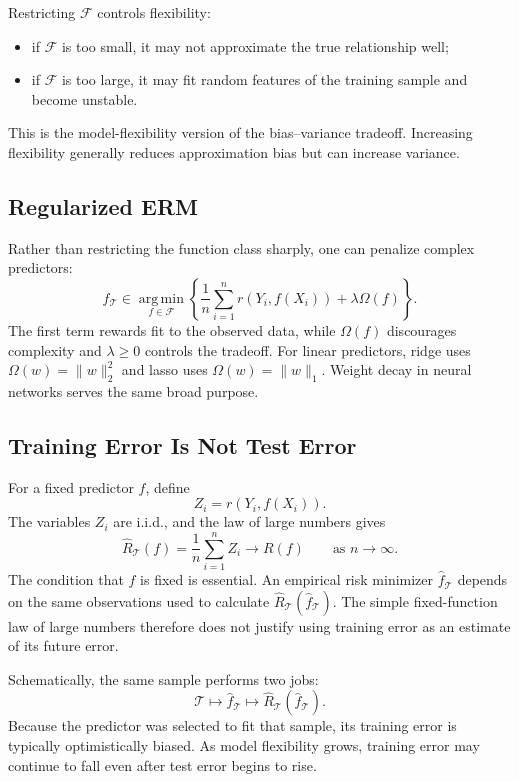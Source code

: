 \documentclass[12pt,oneside]{book}
\numberwithin{equation}{section}
\theoremstyle{definition}
\theoremstyle{plain}
\theoremstyle{remark}
\newcommand{\argmin}{\operatorname*{arg\,min}}
\begin{document}
Restricting $\mathcal{F}$ controls flexibility:
\begin{itemize}
    \item if $\mathcal{F}$ is too small, it may not approximate the true
    relationship well;
    \item if $\mathcal{F}$ is too large, it may fit random features of the
    training sample and become unstable.
\end{itemize}
This is the model-flexibility version of the bias--variance tradeoff. Increasing
flexibility generally reduces approximation bias but can increase variance.

\subsection{Regularized ERM}
Rather than restricting the function class sharply, one can penalize complex
predictors:
\[
\widehat f_{\mathcal{T}}
\in\argmin_{f\in\mathcal{F}}
\left\{
\frac1n\sum_{i=1}^n r(Y_i,f(X_i))
+\lambda\Omega(f)
\right\}.
\]
The first term rewards fit to the observed data, while $\Omega(f)$ discourages
complexity and $\lambda\geq0$ controls the tradeoff. For linear predictors,
ridge uses $\Omega(w)=\lVert w\rVert_2^2$ and lasso uses
$\Omega(w)=\lVert w\rVert_1$. Weight decay in neural networks serves the same
broad purpose.

\subsection{Training Error Is Not Test Error}
For a fixed predictor $f$, define
\[
Z_i=r(Y_i,f(X_i)).
\]
The variables $Z_i$ are i.i.d., and the law of large numbers gives
\[
\widehat R_{\mathcal{T}}(f)
=\frac1n\sum_{i=1}^nZ_i
\longrightarrow R(f)
\qquad\text{as }n\to\infty.
\]
The condition that $f$ is fixed is essential. An empirical risk minimizer
$\widehat f_{\mathcal{T}}$ depends on the same observations used to calculate
$\widehat R_{\mathcal{T}}(\widehat f_{\mathcal{T}})$. The simple fixed-function
law of large numbers therefore does not justify using training error as an
estimate of its future error.

Schematically, the same sample performs two jobs:
\[
\mathcal{T}\longmapsto\widehat f_{\mathcal{T}}
\longmapsto\widehat R_{\mathcal{T}}
(\widehat f_{\mathcal{T}}).
\]
Because the predictor was selected to fit that sample, its training error is
typically optimistically biased. As model flexibility grows, training error may
continue to fall even after test error begins to rise.
\end{document}

